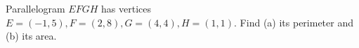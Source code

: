 Parallelogram $EFGH$ has vertices $E=(-1,5),F=(2,8),G=(4,4),H=(1,1)$. Find (a) its perimeter and (b) its area.
